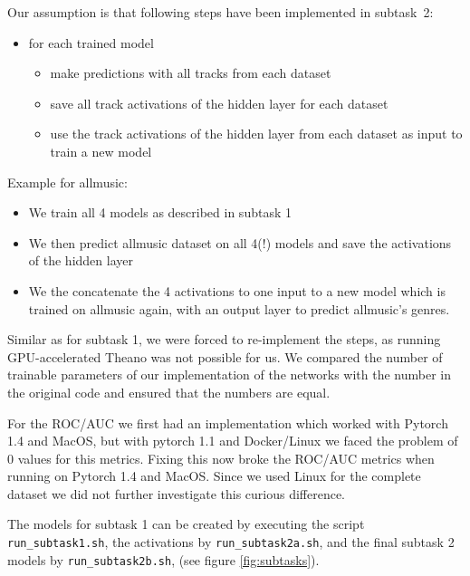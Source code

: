 \documentclass[sigconf,nonacm]{acmart}
\begin{document}
Our assumption is that following steps have been implemented in subtask~2:

\begin{itemize}
  \item for each trained model
  \begin{itemize}
    \item make predictions with all tracks from each dataset
    \item save all track activations of the hidden layer for each dataset
    \item use the track activations of the hidden layer from each dataset as input to train a new model
  \end{itemize}
\end{itemize}

Example for allmusic: 
\begin{itemize}
  \item We train all 4 models as described in subtask 1
  \item We then predict allmusic dataset on all 4(!) models and save the activations of the hidden layer
  \item We the concatenate the 4 activations to one input
  to a new model which is trained on allmusic again, with an
  output layer to predict allmusic's genres.
\end{itemize}

Similar as for subtask 1, we were forced to re-implement the steps,
as running GPU-accelerated Theano was not possible for us.
We compared the number of trainable parameters of our implementation
of the networks with the number in the original code and ensured
that the numbers are equal.

For the ROC/AUC we first had an implementation which worked with
Pytorch 1.4 and MacOS, but with pytorch 1.1 and Docker/Linux
we faced the problem of 0 values for this metrics.
Fixing this now broke the ROC/AUC metrics when running on
Pytorch 1.4 and MacOS.
Since we used Linux for the complete dataset we did not further
investigate this curious difference.

The models for subtask 1 can be created by executing
the script
\texttt{run\_subtask1.sh},
the activations by 
\texttt{run\_subtask2a.sh}, and the final subtask 2
models by \texttt{run\_subtask2b.sh}, (see figure \ref{fig:subtasks}).
\end{document}
